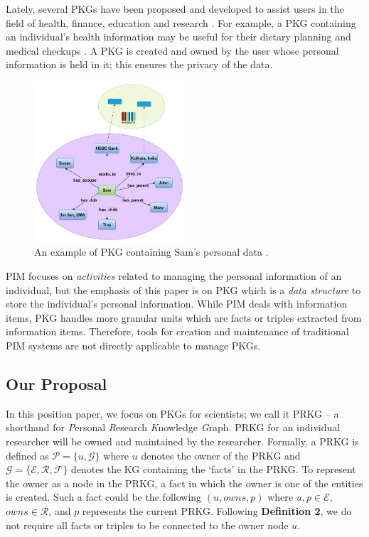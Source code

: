 \documentclass[11pt,pdftex]{article}
\begin{document}
Lately, several PKGs have been proposed and developed to assist users in the field of health, finance, education and research \cite{Chakraborty2023comprehensive}. For example, a PKG containing an individual's health information may be useful for their dietary planning and medical checkups \cite{seneviratne2021personal}. A PKG is created and owned by the user whose personal information is held in it; this ensures the privacy of the data.  
\begin{figure}[!htbp] 
    \centering
    \includegraphics[width=0.5\textwidth]{submissions/Sudakshina2023/figs/PKG.jpg}
    \caption{An example of PKG containing Sam's personal data \cite{Chakraborty2023comprehensive}.}
    \label{fig:pkg}
\end{figure}

PIM focuses on \textit{activities} related to managing the personal information of an individual, but the emphasis of this paper is on PKG which is a \textit{data structure} to store the individual's personal information. While PIM deals with information items, PKG handles more granular units which are facts or triples extracted from information items. Therefore,  tools for creation and maintenance of traditional PIM systems are not directly applicable to manage PKGs. 

\subsection{Our Proposal}
In this position paper, we focus on PKGs for scientists; we call it PRKG -- a shorthand for \textit{P}ersonal \textit{R}esearch \textit{K}nowledge \textit{G}raph. 
PRKG for an individual researcher will be owned and maintained by the researcher. 
Formally, a PRKG is defined as $\mathcal{P} = \{u, \mathcal{G}\}$ where $u$ denotes the owner of the PRKG and $\mathcal{G} = \{\mathcal{E}, \mathcal{R}, \mathcal{F}\}$ denotes the KG containing the `facts' in the PRKG. To represent the owner as a node in the PRKG, a fact in which the owner is one of the entities is created. Such a fact could be the following $(u, owns, p)$ where $u, p \in \mathcal{E}$, $owns \in \mathcal{R}$, and $p$ represents the current PRKG. Following \textbf{Definition 2}, we do not require all facts or triples to be connected to the owner node $u$.
\end{document}

